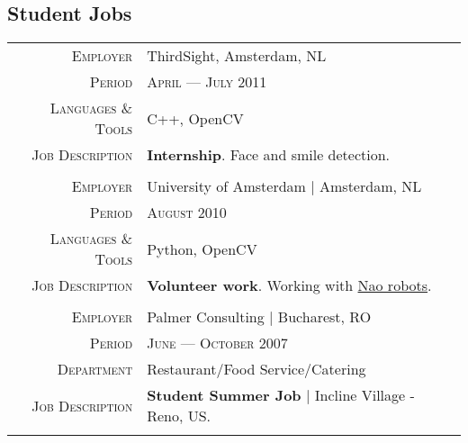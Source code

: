 \documentclass[a4paper, oneside, final]{scrartcl}
\newcommand{\gray}{\rowcolor[gray]{.90}}
\begin{document}
\begin{center}
		\section{Student Jobs}
		\begin{tabular}{r@{\hskip 0.3in}p{11.3cm}}
			\gray \textsc{Employer}     & ThirdSight, Amsterdam, NL\\
			\textsc{Period}             & \textsc{April --- July 2011} \\
			\textsc{Languages \& Tools} & C++, OpenCV\\
			\textsc{Job Description}    & \textbf{Internship}. 
				Face and smile detection.\\ 
			\multicolumn{2}{c}{}\\ %
			\gray \textsc{Employer}     & University of Amsterdam $\mid$ Amsterdam, NL\\
			\textsc{Period}             & \textsc{August 2010} \\
			\textsc{Languages \& Tools} & Python, OpenCV\\
			\textsc{Job Description}    & \textbf{Volunteer work}. 
				Working with \href{http://www.aldebaran-robotics.com/en}{Nao robots}.\\
			\multicolumn{2}{c}{}\\ %
			\gray \textsc{Employer}  & Palmer Consulting $\mid$ Bucharest, RO\\
			\textsc{Period}          & \textsc{June --- October 2007}\\
			\textsc{Department}      & Restaurant\slash Food Service\slash Catering\\
			\textsc{Job Description} & \textbf{Student Summer Job} $\mid$ Incline Village - Reno, US.\\
			\multicolumn{2}{c}{}\\
		\end{tabular}


\end{center}
\end{document}
